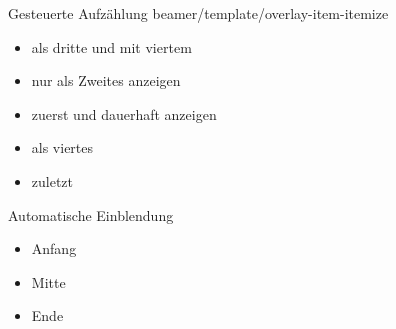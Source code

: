 \begin{frame}[c]{}
  Gesteuerte Aufzählung beamer/template/overlay-item-itemize
  \begin{itemize}
    \item<3-4> als dritte und mit viertem
    \item<2>   nur als Zweites anzeigen
    \item<1->  zuerst und dauerhaft anzeigen
    \item<4>   als viertes
    \item<5->  zuletzt
  \end{itemize}
  Automatische Einblendung
  \begin{itemize}[<+->]
    \item Anfang
    \item Mitte
    \item Ende
  \end{itemize}
\end{frame}
